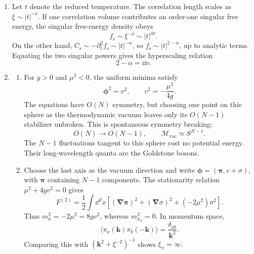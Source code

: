 
\begin{enumerate}
  \begin{enumerate}
    \item[(a)]
    Let \(t\) denote the reduced temperature.  The correlation length scales
    as \(\xi\sim |t|^{-\nu}\).  If one correlation volume contributes an
    order-one singular free energy, the singular free-energy density obeys
    \[
      f_{\mathrm s}\sim \xi^{-\dd}\sim |t|^{\dd\nu}.
    \]
    On the other hand,
    \(C_{\mathrm s}\sim-\partial_t^2f_{\mathrm s}\sim|t|^{-\alpha}\),
    so \(f_{\mathrm s}\sim|t|^{2-\alpha}\), up to analytic terms.  Equating
    the two singular powers gives the hyperscaling relation
    \[
      \boxed{2-\alpha=\dd\nu.}
    \]
    \item[(b)]
    \begin{enumerate}
      \item[(i)]
      For \(g>0\) and \(\mu^2<0\), the uniform minima satisfy
      \[
        \boldsymbol\phi^2=v^2,
        \qquad v^2=-\frac{\mu^2}{4g}.
      \]
      The equations have \(O(N)\) symmetry, but choosing one point on this
      sphere as the thermodynamic vacuum leaves only its \(O(N-1)\)
      stabilizer unbroken.  This is spontaneous symmetry breaking:
      \[
        O(N)\longrightarrow O(N-1),
        \qquad \mathcal M_{\mathrm{vac}}\simeq S^{N-1}.
      \]
      The \(N-1\) fluctuations tangent to this sphere cost no potential
      energy.  Their long-wavelength quanta are the Goldstone bosons.

      \item[(ii)]
      Choose the last axis as the vacuum direction and write
      \(\boldsymbol\phi=(\boldsymbol\pi,v+\sigma)\), with
      \(\boldsymbol\pi\) containing \(N-1\) components.  The stationarity
      relation \(\mu^2+4gv^2=0\) gives
      \[
        F^{(2)}=\frac12\int \dd^dx\left[
          (\boldsymbol\nabla\boldsymbol\pi)^2
          +(\boldsymbol\nabla\sigma)^2
          +(-2\mu^2)\sigma^2\right].
      \]
      Thus \(m_\sigma^2=-2\mu^2=8gv^2\), whereas
      \(m_{\pi_a}^2=0\).  In momentum space,
      \[
        \langle\pi_a(\boldsymbol k)\pi_b(-\boldsymbol k)\rangle
          =\frac{\delta_{ab}}{\boldsymbol k^2}.
      \]
      Comparing this with \((\boldsymbol k^2+\xi^{-2})^{-1}\) shows
      \(\boxed{\xi_\pi=\infty}\).


\end{enumerate}
\end{enumerate}
\end{enumerate}
